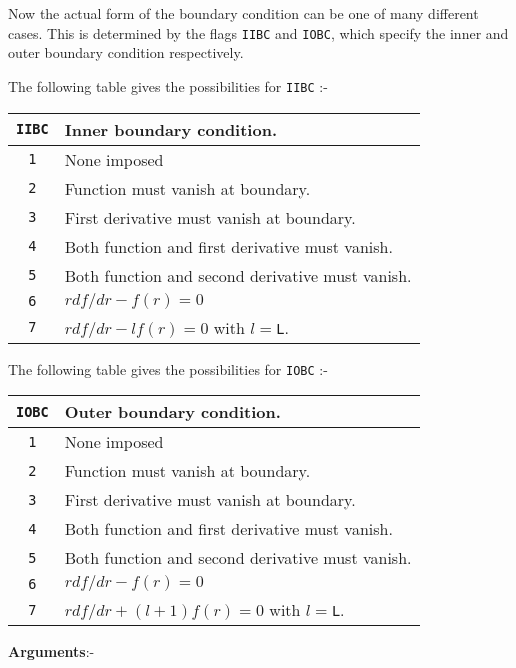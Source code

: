 Now the actual form of the boundary condition
can be one of many different cases. This is 
determined by the flags \verb+IIBC+ and 
\verb+IOBC+, which specify the inner and outer
boundary condition respectively.

The following table gives the possibilities for
\verb+IIBC+ :- \newline

\begin{tabular}{|c|l|}
\hline
\verb+IIBC+ & Inner boundary condition. \\
\hline
\hline
\verb+1+ & None imposed \\
\hline
\verb+2+ & Function must vanish at boundary. \\
\hline
\verb+3+ & First derivative must vanish at boundary. \\
\hline
\verb+4+ & Both function and first derivative must vanish. \\
\hline
\verb+5+ & Both function and second derivative must vanish. \\
\hline
\verb+6+ & $rdf/dr - f(r) = 0$ \\
\hline
\verb+7+ & $r df/dr - l f(r) = 0$ with $l=$\verb+L+. \\
\hline
\end{tabular} \newline

The following table gives the possibilities for
\verb+IOBC+ :- \newline

\begin{tabular}{|c|l|}
\hline
\verb+IOBC+ & Outer boundary condition. \\
\hline
\hline
\verb+1+ & None imposed \\
\hline
\verb+2+ & Function must vanish at boundary. \\
\hline
\verb+3+ & First derivative must vanish at boundary. \\
\hline
\verb+4+ & Both function and first derivative must vanish. \\
\hline
\verb+5+ & Both function and second derivative must vanish. \\
\hline
\verb+6+ & $rdf/dr - f(r) = 0$ \\
\hline
\verb+7+ & $r df/dr + (l+1) f(r) = 0$ with $l=$\verb+L+. \\
\hline
\end{tabular} \newline

{\bf Arguments}:- \newline

